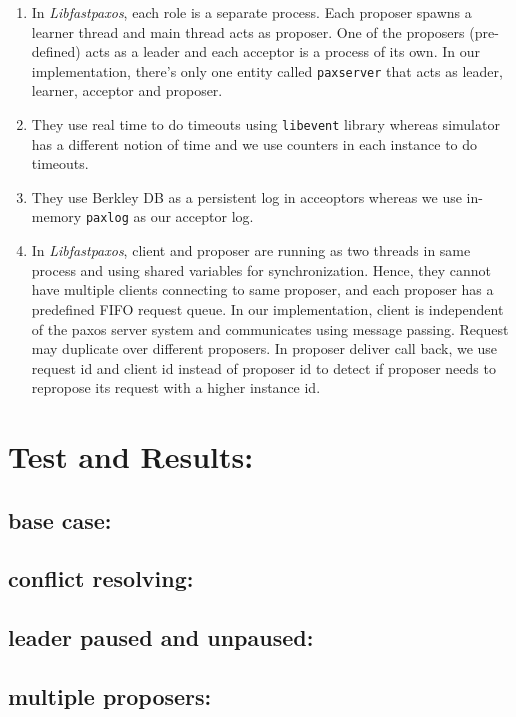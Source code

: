 \begin{enumerate}
\item  In \textit{Libfastpaxos}, each role is a separate process. Each proposer spawns a learner thread and main thread acts as proposer. One of the proposers (pre-defined) acts as a leader and each acceptor is a process of its own. In our implementation, there's only one entity called \texttt{paxserver} that acts as leader, learner, acceptor and proposer.
\item They use real time to do timeouts using \texttt{libevent} library whereas simulator has a different notion of time and we use counters in each instance to do timeouts.
\item They use Berkley DB as a persistent log in acceoptors whereas we use in-memory \texttt{paxlog} as our acceptor log.
\item In \textit{Libfastpaxos}, client and proposer are running as two threads in same process and using shared variables for synchronization. Hence, they cannot have multiple clients connecting to same proposer, and each proposer has a predefined FIFO request queue. In our implementation, client is independent of the paxos server system and communicates using message passing. Request may duplicate over different proposers. In proposer deliver call back, we use request id and client id instead of proposer id to detect if proposer needs to repropose its request with a higher instance id.
\end{enumerate}

\section{Test and Results:}
\subsection{base case:}
\subsection{conflict resolving:}
\subsection{leader paused and unpaused:}
\subsection{multiple proposers:}

